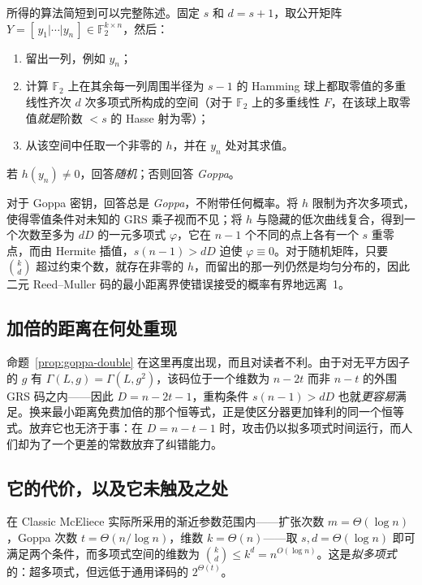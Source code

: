 所得的算法简短到可以完整陈述。固定 $s$ 和 $d = s+1$，取公开矩阵 $Y = [\,y_1|\cdots|y_n\,] \in \mathbb{F}_2^{k\times n}$，然后：

\begin{enumerate}
  \item 留出一列，例如 $y_n$；
  \item 计算 $\mathbb{F}_2$ 上在其余每一列周围半径为 $s-1$ 的 Hamming 球上都取零值的多重线性齐次 $d$ 次多项式所构成的空间（对于 $\mathbb{F}_2$ 上的多重线性 $F$，在该球上取零值\emph{就是}阶数 $<s$ 的 Hasse 射为零）；
  \item 从该空间中任取一个非零的 $h$，并在 $y_n$ 处对其求值。
\end{enumerate}

若 $h(y_n) \ne 0$，回答\emph{随机}；否则回答 \emph{Goppa}。

对于 Goppa 密钥，回答总是 \emph{Goppa}，不附带任何概率。将 $h$ 限制为齐次多项式，使得零值条件对未知的 GRS 乘子视而不见；将 $h$ 与隐藏的低次曲线复合，得到一个次数至多为 $dD$ 的一元多项式 $\varphi$，它在 $n-1$ 个不同的点上各有一个 $s$ 重零点，而由 Hermite 插值，$s(n-1) > dD$ 迫使 $\varphi \equiv 0$。对于随机矩阵，只要 $\binom{k}{d}$ 超过约束个数，就存在非零的 $h$，而留出的那一列仍然是均匀分布的，因此二元 Reed--Muller 码的最小距离界使错误接受的概率有界地远离~1。

\subsection{加倍的距离在何处重现}

命题~\ref{prop:goppa-double} 在这里再度出现，而且对读者不利。由于对无平方因子的 $g$ 有 $\Gamma(L,g) = \Gamma(L,g^2)$，该码位于一个维数为 $n-2t$ 而非 $n-t$ 的外围 GRS 码之内——因此 $D = n-2t-1$，重构条件 $s(n-1) > dD$ 也就\emph{更容易}满足。换来最小距离免费加倍的那个恒等式，正是使区分器更加锋利的同一个恒等式。放弃它也无济于事：在 $D = n-t-1$ 时，攻击仍以拟多项式时间运行，而人们却为了一个更差的常数放弃了纠错能力。

\subsection{它的代价，以及它未触及之处}

在 Classic McEliece 实际所采用的渐近参数范围内——扩张次数 $m = \Theta(\log n)$，Goppa 次数 $t = \Theta(n/\log n)$，维数 $k = \Theta(n)$——取 $s,d = \Theta(\log n)$ 即可满足两个条件，而多项式空间的维数为 $\binom{k}{d} \le k^d = n^{O(\log n)}$。这是\emph{拟多项式}的：超多项式，但远低于通用译码的 $2^{\Theta(t)}$。

